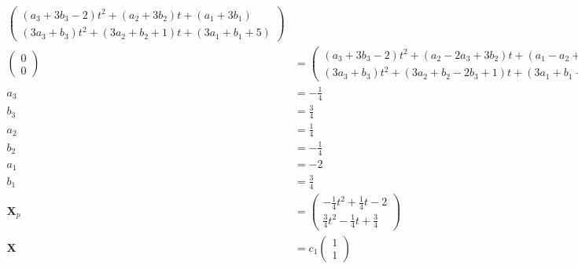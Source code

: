 \documentclass{article}
\begin{document}
\begin{align*}
\begin{pmatrix}
                         (a_3 + 3 b_3 - 2) t^2 + (a_2 + 3 b_2) t + (a_1 + 3 b_1) \\
                         (3 a_3 + b_3) t^2 + (3 a_2 + b_2 + 1) t + (3 a_1 + b_1 + 5)
                       \end{pmatrix}                                            \\
  \begin{pmatrix}
    0 \\
    0
  \end{pmatrix}  & = \begin{pmatrix}
                       (a_3 + 3 b_3 - 2) t^2 + (a_2 - 2 a_3 + 3 b_2) t + (a_1 - a_2 + 3 b_1) \\
                       (3 a_3 + b_3) t^2 + (3 a_2 + b_2 - 2 b_3 + 1) t + (3 a_1 + b_1 - b_2 + 5)
                     \end{pmatrix}                                \\
  a_3              & = -\frac{1}{4}                                                                                          \\
  b_3              & = \frac{3}{4}                                                                                           \\
  a_2              & = \frac{1}{4}                                                                                           \\
  b_2              & = -\frac{1}{4}                                                                                          \\
  a_1              & = -2                                                                                                    \\
  b_1              & = \frac{3}{4}                                                                                           \\
  \mathbf{X}_p     & = \begin{pmatrix}
                         -\frac{1}{4} t^2 + \frac{1}{4} t - 2 \\
                         \frac{3}{4} t^2 - \frac{1}{4} t + \frac{3}{4}
                       \end{pmatrix}                                                          \\
  \mathbf{X}       & = c_1 \begin{pmatrix}
                             1 \\
                             1

\end{pmatrix}
\end{align*}
\end{document}
